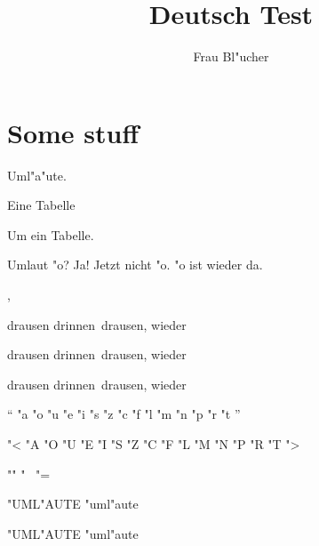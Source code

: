 \documentclass{report}
\begin{document}
\title{Deutsch Test}
\author{Frau Bl"ucher}
\maketitle
\chapter{Some stuff}
Uml"a"ute.  %
\begin{table}
Eine Tabelle
\caption{Um ein Tabelle.}
\end{table}

Umlaut "o? Ja! \mdqoff Jetzt nicht "o. \mdqon "o ist wieder da.


\dj \DJ, \ij \IJ

\flqq drausen \flq drinnen\frq\ drausen, wieder\frqq

\glqq drausen \glq drinnen\grq\ drausen, wieder\grqq

\guillemotleft drausen \guilsinglleft drinnen\guilsinglright\ drausen, wieder\guillemotright

 "` "a "o "u "e "i "s "z "c "f "l "m "n "p "r "t  "'

"< "A "O "U "E "I "S "Z "C "F "L "M "N "P "R "T  "> 

"" "~ "=

\uppercase{"uml"aute}
\lowercase{"UML"AUTE}


\MakeUppercase{"uml"aute}
\MakeLowercase{"UML"AUTE}
\end{document}
